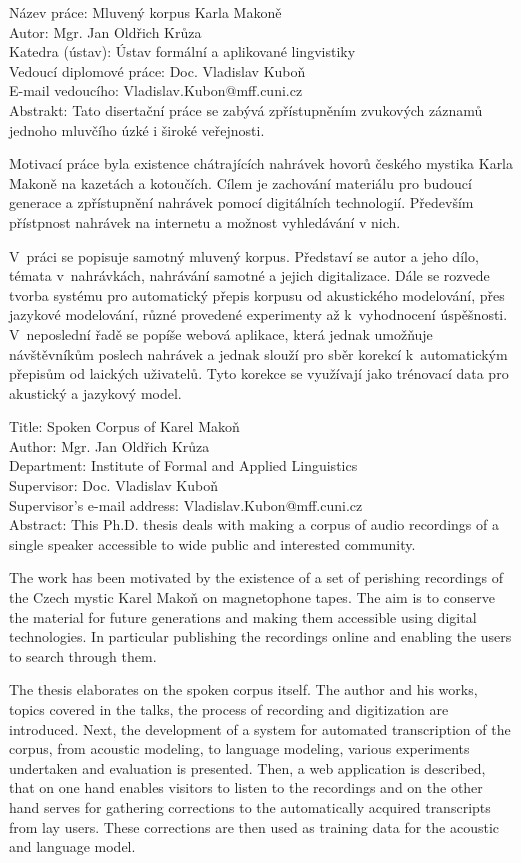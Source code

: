 \noindent Název práce: Mluven\'{y} korpus Karla Makon\v{e}\\
Autor: Mgr. Jan Oldřich Krůza\\
Katedra (ústav): Ústav formální a aplikované lingvistiky\\
Vedoucí diplomové práce: Doc. Vladislav Kuboň\\
E-mail vedoucího: Vladislav.Kubon@mff.cuni.cz\\

\noindent Abstrakt: Tato disertační práce se zabývá zpřístupněním zvukových
záznamů jednoho mluvčího úzké i široké veřejnosti.

Motivací práce byla existence chátrajících nahrávek hovorů českého mystika
Karla Makoně na kazetách a kotoučích. Cílem je zachování materiálu pro
budoucí generace a zpřístupnění nahrávek pomocí digitálních technologií.
Především přístpnost nahrávek na internetu a možnost vyhledávání v nich.

V~práci se popisuje samotný mluvený korpus. Představí se autor a
jeho dílo,
témata v~nahrávkách, nahrávání samotné a jejich digitalizace. Dále se rozvede tvorba systému pro automatický
přepis korpusu od akustického modelování, přes jazykové modelování, různé
provedené experimenty až k~vyhodnocení úspěšnosti. V~neposlední řadě se popíše
webová aplikace, která jednak umožňuje návštěvníkům
poslech nahrávek a jednak slouží pro sběr korekcí k~automatickým přepisům od
laických uživatelů. Tyto korekce se využívají jako trénovací
data pro akustický a jazykový model.

\vspace{10mm}

\noindent
Title: Spoken Corpus of Karel Makoň\\
Author: Mgr. Jan Oldřich Krůza\\
Department: Institute of Formal and Applied Linguistics\\
Supervisor: Doc. Vladislav Kuboň\\
Supervisor's e-mail address: Vladislav.Kubon@mff.cuni.cz\\

\noindent Abstract:  This Ph.D. thesis deals with making a corpus of audio
recordings of a single speaker accessible to wide public and interested community.

The work has been motivated by the existence of a set of perishing recordings
of the Czech mystic Karel Makoň on magnetophone tapes. The aim is to conserve
the material for future generations and making them accessible using
digital technologies. In particular publishing the recordings online
and enabling the users to search through them.

The thesis elaborates on the spoken corpus itself. The
author and his works, topics covered in the talks, the process of recording
and digitization are introduced. Next, the development of a system for automated transcription of
the corpus, from acoustic modeling, to language modeling, various experiments
undertaken and evaluation is presented. Then, a web application is described,
that on one hand enables visitors to listen to the recordings and on the other
hand serves for gathering corrections to the automatically acquired transcripts from lay users.
These corrections are then used as training data for the acoustic and language
model.
